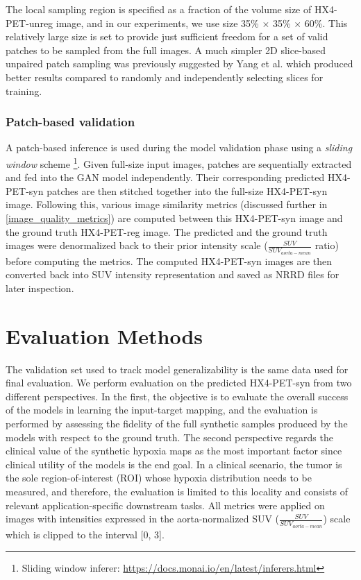 The local sampling region is specified as a fraction of the volume size of HX4-PET-unreg image, and in our experiments, we use size 35\% $\times$ 35\% $\times$ 60\%. This relatively large size is set to provide just sufficient freedom for a set of valid patches to be sampled from the full images. A much simpler 2D slice-based unpaired patch sampling was previously suggested by Yang et al. \cite{yang2018unpaired} which produced better results compared to randomly and independently selecting slices for training.

\subsubsection{Patch-based validation}
A patch-based inference is used during the model validation phase using a \textit{sliding window} scheme \footnote{Sliding window inferer: \url{https://docs.monai.io/en/latest/inferers.html}}. Given full-size input images, patches are sequentially extracted and fed into the GAN model independently. Their corresponding predicted HX4-PET-syn patches are then stitched together into the full-size HX4-PET-syn image. Following this, various image similarity metrics (discussed further in \ref{image_quality_metrics}) are computed between this HX4-PET-syn image and the ground truth HX4-PET-reg image. The predicted and the ground truth images were denormalized back to their prior intensity scale ($\frac{SUV}{SUV_{aorta-mean}}$ ratio) before computing the metrics. The computed HX4-PET-syn images are then converted back into SUV intensity representation and saved as NRRD files for later inspection.



\section{Evaluation Methods}
\label{Evaluation_Methods}
The validation set used to track model generalizability is the same data used for final evaluation. We perform evaluation on the predicted HX4-PET-syn from two different perspectives. In the first, the objective is to evaluate the overall success of the models in learning the input-target mapping, and the evaluation is performed by assessing the fidelity of the full synthetic samples produced by the models with respect to the ground truth. The second perspective regards the clinical value of the synthetic hypoxia maps as the most important factor since clinical utility of the models is the end goal. In a clinical scenario, the tumor is the sole region-of-interest (ROI) whose hypoxia distribution needs to be measured, and therefore, the evaluation is limited to this locality and consists of relevant application-specific downstream tasks. All metrics were applied on images with intensities expressed in the aorta-normalized SUV ($\frac{SUV}{SUV_{aorta-mean}}$) scale which is clipped to the interval [0, 3]. 


